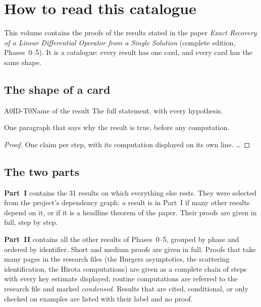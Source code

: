 \chapter*{How to read this catalogue}

This volume contains the proofs of the results stated in the paper \emph{Exact Recovery of a Linear Differential Operator from a Single Solution} (complete edition, Phases~0--5). It is a catalogue: every result has one card, and every card has the same shape.

\section*{The shape of a card}

\begin{dimcard}{A0}{ID-T0}{Name of the result}{\proved}{}
The full statement, with every hypothesis.
\end{dimcard}
\begin{proofidea}
One paragraph that says why the result is true, before any computation.
\end{proofidea}
\begin{proof}
One claim per step, with its computation displayed on its own line.
\dots
{}
\end{proof}

\section*{The two parts}

\textbf{Part~I} contains the 31 results on which everything else rests. They were selected from the project's dependency graph: a result is in Part~I if many other results depend on it, or if it is a headline theorem of the paper. Their proofs are given in full, step by step.

\textbf{Part~II} contains all the other results of Phases~0--5, grouped by phase and ordered by identifier. Short and medium proofs are given in full. Proofs that take many pages in the research files (the Burgers asymptotics, the scattering identification, the Hirota computations) are given as a complete chain of steps with every key estimate displayed; routine computations are referred to the research file and marked \emph{condensed}. Results that are cited, conditional, or only checked on examples are listed with their label and no proof.

